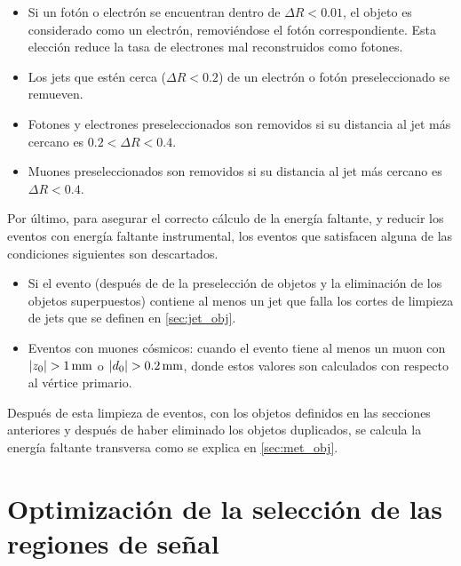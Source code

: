 \begin{itemize}\itemsep0.1cm
\item Si un fotón o electrón se encuentran dentro de $\Delta R < 0.01$, el
  objeto es considerado como un electrón, removiéndose el fotón correspondiente.
  Esta elección reduce la tasa de electrones mal reconstruidos como fotones.
\item Los jets que estén cerca ($\Delta R<0.2$) de un electrón o fotón
  preseleccionado se remueven.
\item Fotones y electrones preseleccionados son removidos si su distancia al jet
  más cercano es $0.2 < \Delta R < 0.4$.
\item Muones preseleccionados son removidos si su distancia al jet más cercano
  es $\Delta R < 0.4$.
\end{itemize}



Por último, para asegurar el correcto cálculo de la energía faltante, y reducir
los eventos con energía faltante instrumental, los eventos que satisfacen
alguna de las condiciones siguientes son descartados.

\begin{itemize}\itemsep0.1cm
\item Si el evento (después de de la preselección de objetos y la eliminación de los objetos superpuestos) contiene al menos
  un jet que falla los cortes de limpieza de jets que se definen en
  \cref{sec:jet_obj}.

\item Eventos con muones cósmicos: cuando el evento tiene al menos un muon con $|z_{0}| > \unit[1]{mm}$ o $|d_0| >
  \unit[0.2]{mm}$, donde estos valores son calculados con respecto al vértice
  primario. %
\end{itemize}

Después de esta limpieza de eventos, con los objetos definidos en las secciones anteriores y después
de haber eliminado los objetos duplicados, se calcula la energía faltante transversa como se explica
en \cref{sec:met_obj}.



\section{Optimización de la selección de las regiones de señal}

